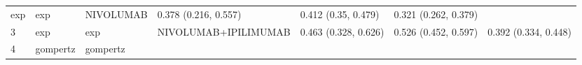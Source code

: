 \documentclass[
]{article}
\begin{document}
\begin{longtable}[]{@{}lllllll@{}}
\begin{minipage}[t]{0.09\columnwidth}
exp\strut
\end{minipage} & \begin{minipage}[t]{0.09\columnwidth}\raggedright
exp\strut
\end{minipage} & \begin{minipage}[t]{0.15\columnwidth}\raggedright
NIVOLUMAB\strut
\end{minipage} & \begin{minipage}[t]{0.15\columnwidth}\raggedright
0.378 (0.216, 0.557)\strut
\end{minipage} & \begin{minipage}[t]{0.15\columnwidth}\raggedright
0.412 (0.35, 0.479)\strut
\end{minipage} & \begin{minipage}[t]{0.15\columnwidth}\raggedright
0.321 (0.262, 0.379)\strut
\end{minipage}\tabularnewline
\begin{minipage}[t]{0.03\columnwidth}\raggedright
3\strut
\end{minipage} & \begin{minipage}[t]{0.09\columnwidth}\raggedright
exp\strut
\end{minipage} & \begin{minipage}[t]{0.09\columnwidth}\raggedright
exp\strut
\end{minipage} & \begin{minipage}[t]{0.15\columnwidth}\raggedright
NIVOLUMAB+IPILIMUMAB\strut
\end{minipage} & \begin{minipage}[t]{0.15\columnwidth}\raggedright
0.463 (0.328, 0.626)\strut
\end{minipage} & \begin{minipage}[t]{0.15\columnwidth}\raggedright
0.526 (0.452, 0.597)\strut
\end{minipage} & \begin{minipage}[t]{0.15\columnwidth}\raggedright
0.392 (0.334, 0.448)\strut
\end{minipage}\tabularnewline
\begin{minipage}[t]{0.03\columnwidth}\raggedright
4\strut
\end{minipage} & \begin{minipage}[t]{0.09\columnwidth}\raggedright
gompertz\strut
\end{minipage} & \begin{minipage}[t]{0.09\columnwidth}\raggedright
gompertz\strut
\end{minipage} & \begin{minipage}[t]{0.15\columnwidth}\raggedright

\end{minipage}
\end{longtable}
\end{document}
